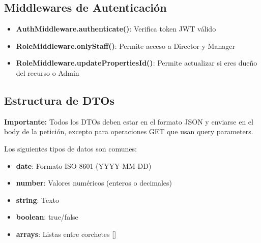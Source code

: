 \documentclass[11pt]{article}
\begin{document}
\subsection*{Middlewares de Autenticación}
\begin{itemize}
    \item \textbf{AuthMiddleware.authenticate()}: Verifica token JWT válido
    \item \textbf{RoleMiddleware.onlyStaff()}: Permite acceso a Director y Manager
    \item \textbf{RoleMiddleware.updatePropertiesId()}: Permite actualizar si eres dueño del recurso o Admin
\end{itemize}

\subsection*{Estructura de DTOs}

\textbf{Importante:} Todos los DTOs deben estar en el formato JSON y enviarse en el body de la petición, excepto para operaciones GET que usan query parameters.

Los siguientes tipos de datos son comunes:
\begin{itemize}
    \item \textbf{date}: Formato ISO 8601 (YYYY-MM-DD)
    \item \textbf{number}: Valores numéricos (enteros o decimales)
    \item \textbf{string}: Texto
    \item \textbf{boolean}: true/false
    \item \textbf{arrays}: Listas entre corchetes []
\end{itemize}
\end{document}
